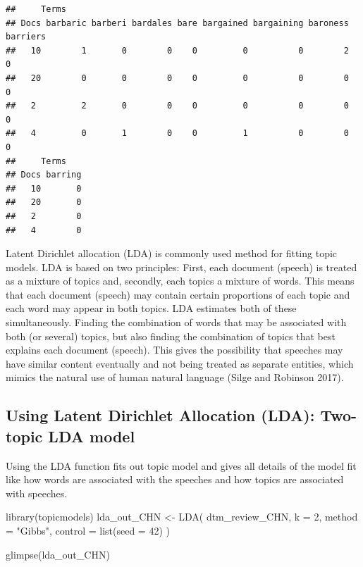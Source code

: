 \documentclass[
]{article}
\newenvironment{Shaded}{\begin{snugshade}}{\end{snugshade}}
\newcommand{\AttributeTok}[1]{\textcolor[rgb]{0.77,0.63,0.00}{#1}}
\newcommand{\DecValTok}[1]{\textcolor[rgb]{0.00,0.00,0.81}{#1}}
\newcommand{\FunctionTok}[1]{\textcolor[rgb]{0.00,0.00,0.00}{#1}}
\newcommand{\NormalTok}[1]{#1}
\newcommand{\OtherTok}[1]{\textcolor[rgb]{0.56,0.35,0.01}{#1}}
\newcommand{\StringTok}[1]{\textcolor[rgb]{0.31,0.60,0.02}{#1}}
\begin{document}
\begin{verbatim}
##     Terms
## Docs barbaric barberi bardales bare bargained bargaining baroness barriers
##   10        1       0        0    0         0          0        2        0
##   20        0       0        0    0         0          0        0        0
##   2         2       0        0    0         0          0        0        0
##   4         0       1        0    0         1          0        0        0
##     Terms
## Docs barring
##   10       0
##   20       0
##   2        0
##   4        0
\end{verbatim}

Latent Dirichlet allocation (LDA) is commonly used method for fitting
topic models. LDA is based on two principles: First, each document
(speech) is treated as a mixture of topics and, secondly, each topics a
mixture of words. This means that each document (speech) may contain
certain proportions of each topic and each word may appear in both
topics. LDA estimates both of these simultaneously. Finding the
combination of words that may be associated with both (or several)
topics, but also finding the combination of topics that best explains
each document (speech). This gives the possibility that speeches may
have similar content eventually and not being treated as separate
entities, which mimics the natural use of human natural language (Silge
and Robinson 2017).

\hypertarget{using-latent-dirichlet-allocation-lda-two-topic-lda-model}{%
\subsection{Using Latent Dirichlet Allocation (LDA): Two-topic LDA
model}\label{using-latent-dirichlet-allocation-lda-two-topic-lda-model}}

Using the LDA function fits out topic model and gives all details of the
model fit like how words are associated with the speeches and how topics
are associated with speeches.

\begin{Shaded}
\begin{Highlighting}[]
\FunctionTok{library}\NormalTok{(topicmodels)}
\NormalTok{lda\_out\_CHN }\OtherTok{\textless{}{-}} \FunctionTok{LDA}\NormalTok{( }
\NormalTok{  dtm\_review\_CHN, }
  \AttributeTok{k =} \DecValTok{2}\NormalTok{, }
  \AttributeTok{method =} \StringTok{"Gibbs"}\NormalTok{, }
  \AttributeTok{control =} \FunctionTok{list}\NormalTok{(}\AttributeTok{seed =} \DecValTok{42}\NormalTok{) }
\NormalTok{) }

\FunctionTok{glimpse}\NormalTok{(lda\_out\_CHN)}
\end{Highlighting}
\end{Shaded}
\end{document}
